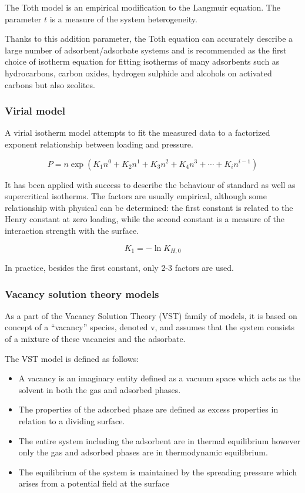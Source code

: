 The Toth model is an empirical modification to the Langmuir equation.
The parameter \(t\) is a measure of the system heterogeneity.

Thanks to this addition parameter, the Toth equation can accurately describe a
large number of adsorbent/adsorbate systems and is recommended as the first
choice of isotherm equation for fitting isotherms of many adsorbents such as
hydrocarbons, carbon oxides, hydrogen sulphide and alcohols on activated carbons
but also zeolites.


\subsubsection{Virial model}

A virial isotherm model attempts to fit the measured data to a factorized
    exponent relationship between loading and pressure.

\begin{equation}
    P = n \exp{(K_1n^0 + K_2n^1 + K_3n^2 + K_4n^3 + \cdots + K_i n^{i-1})}
\end{equation}

It has been applied with success to describe the behaviour of standard as
well as supercritical isotherms. The factors are usually empirical,
although some relationship with physical can be determined:
the first constant is related to the Henry constant at zero loading, while
the second constant is a measure of the interaction strength with the surface.

\begin{equation}
    K_1 = -\ln{K_{H,0}}
\end{equation}

In practice, besides the first constant, only 2-3 factors are used.


\subsubsection{Vacancy solution theory models}


As a part of the Vacancy Solution Theory (VST) family of models, it is based on concept
of a “vacancy” species, denoted v, and assumes that the system consists of a
mixture of these vacancies and the adsorbate.

The VST model is defined as follows:

\begin{itemize}
    
    \item A vacancy is an imaginary entity defined as a vacuum space
    which acts as the solvent in both the gas and adsorbed phases.
    \item The properties of the adsorbed phase are defined as excess properties
    in relation to a dividing surface.
    \item The entire system including the adsorbent are in thermal equilibrium
    however only the gas and adsorbed phases are in thermodynamic equilibrium.
    \item The equilibrium of the system is maintained by the spreading pressure
    which arises from a potential field at the surface

\end{itemize}
    
